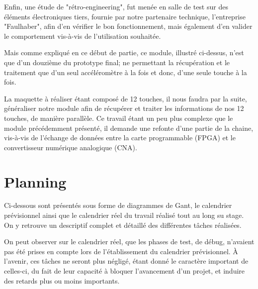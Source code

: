 \documentclass[french,a4paper,12pt]{report}
\begin{document}
	Enfin, une étude de "rétro-engineering", fut menée en salle de test sur des éléments électroniques tiers, fournie par notre partenaire technique, l'entreprise "Faulhaber", afin d'en vérifier le bon fonctionnement, mais également d'en valider le comportement vis-à-vis de l'utilisation souhaitée.
	
	Mais comme expliqué en ce début de partie, ce module, illustré ci-dessus, n'est que d'un douzième du prototype final; ne permettant la récupération et le traitement que d'un seul accéléromètre à la fois et donc, d'une seule touche à la fois.
	
	La maquette à réaliser étant composé de 12 touches, il nous faudra par la suite, généraliser notre module afin de récupérer et traiter les informations de nos 12 touches, de manière parallèle.
	Ce travail étant un peu plus complexe que le module précédemment présenté, il demande une refonte d'une partie de la chaine, vis-à-vis de l'échange de données entre la carte programmable (FPGA) et le convertisseur numérique analogique (CNA).
	
	\chapter{Planning}

	Ci-dessous sont présentés sous forme de diagrammes de Gant, le calendrier prévisionnel ainsi que le calendrier réel du travail réalisé tout au long su stage.
	On y retrouve un descriptif complet et détaillé des différentes tâches réalisées.
	
	On peut observer sur le calendrier réel, que les phases de test, de débug, n'avaient pas été prises en compte lors de l'établissement du calendrier prévisionnel.
	À l'avenir, ces tâches ne seront plus négligé, étant donné le caractère important de celles-ci, du fait de leur capacité à bloquer l'avancement d'un projet, et induire des retards plus ou moins importants.
	
	
	
	
	
		
	
	
	
	
%
%
\end{document}
